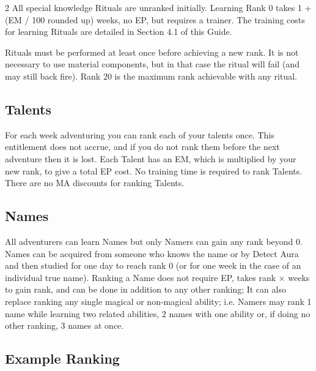 \begin{multicols}{2}
All special knowledge Rituals are unranked initially. Learning Rank 0
takes 1 + (EM / 100 rounded up) weeks, no EP, but requires a
trainer. The training costs for learning Rituals are detailed in
Section 4.1 of this Guide.

Rituals must be performed at least once before achieving a new
rank. It is not necessary to use material components, but in that case
the ritual will fail (and may still back fire). Rank 20 is the maximum
rank achievable with any ritual.

\subsection{Talents}

For each week adventuring you can rank each of your talents once. This
entitlement does not accrue, and if you do not rank them before the
next adventure then it is lost.  Each Talent has an EM, which is
multiplied by your new rank, to give a total EP cost. No training time
is required to rank Talents.  There are no MA discounts for ranking
Talents.

\subsection{Names}

All adventurers can learn Names but only Namers can gain any rank
beyond 0. Names can be acquired from someone who knows the name or by
Detect Aura and then studied for one day to reach rank 0 (or for one
week in the case of an individual true name).  Ranking a Name does not
require EP, takes rank × weeks to gain rank, and can be done in
addition to any other ranking; It can also replace ranking any single
magical or non-magical ability; i.e. Namers may rank 1 name while
learning two related abilities, 2 names with one ability or, if doing
no other ranking, 3 names at once.

\end{multicols}

\subsection{Example Ranking}

